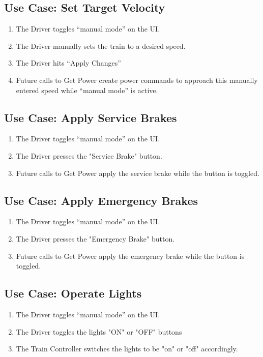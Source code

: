 \documentclass{scrreprt}
\begin{document}
\subsection{Use Case: Set Target Velocity}
\begin{enumerate}
	\item The Driver toggles “manual mode” on the UI.
	\item The Driver manually sets the train to a desired speed.
	\item The Driver hits “Apply Changes”
	\item Future calls to Get Power create power commands to approach this manually entered speed while “manual mode” is active.
\end{enumerate}

\subsection{Use Case: Apply Service Brakes}
\begin{enumerate}
	\item The Driver toggles “manual mode” on the UI.
	\item The Driver presses the "Service Brake" button.
	\item Future calls to Get Power apply the service brake while the button is toggled.
\end{enumerate}

\subsection{Use Case: Apply Emergency Brakes}
\begin{enumerate}
	\item The Driver toggles “manual mode” on the UI.
	\item The Driver presses the "Emergency Brake" button.
	\item Future calls to Get Power apply the emergency brake while the button is toggled.
\end{enumerate}

\subsection{Use Case: Operate Lights}
\begin{enumerate}
	\item The Driver toggles “manual mode” on the UI.
	\item The Driver toggles the lights "ON" or "OFF" buttons
	\item The Train Controller switches the lights to be "on" or "off" accordingly.
\end{enumerate}
\end{document}
